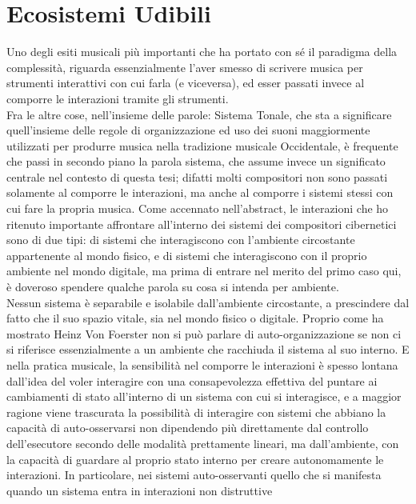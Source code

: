 \section{Ecosistemi Udibili}
\label{sec:Ecosistemi Udibili}

Uno degli esiti musicali più importanti che ha portato con sé 
il paradigma della complessità, riguarda essenzialmente l'aver smesso di 
scrivere musica per strumenti interattivi con cui farla (e viceversa), 
ed esser passati invece al  comporre le interazioni tramite gli strumenti. \\
Fra le altre cose, nell'insieme delle parole: Sistema Tonale, 
che sta a significare quell'insieme delle regole di organizzazione ed uso dei
suoni maggiormente utilizzati per produrre musica nella tradizione 
musicale Occidentale, è frequente che passi in secondo piano la parola 
sistema, che assume invece un significato centrale nel contesto di questa tesi;
difatti molti compositori non sono passati solamente al comporre le interazioni, 
ma anche al comporre i sistemi stessi con cui fare la propria musica.
Come accennato nell'abstract, le interazioni che ho ritenuto importante affrontare 
all'interno dei sistemi dei compositori cibernetici sono di due tipi:
di sistemi che interagiscono con l’ambiente circostante appartenente al mondo fisico, 
e di sistemi che interagiscono con il proprio ambiente nel mondo digitale, 
ma prima di entrare nel merito del primo caso qui,
è doveroso spendere qualche parola su cosa
si intenda per ambiente. \\
Nessun sistema è separabile e isolabile dall'ambiente circostante, 
a prescindere dal fatto che il suo spazio vitale, sia nel mondo fisico o digitale. 
Proprio come ha mostrato Heinz Von Foerster non si può parlare di auto-organizzazione
se non ci si riferisce essenzialmente a un ambiente che racchiuda il sistema al suo interno.
E nella pratica musicale, la sensibilità nel comporre le interazioni
è spesso lontana dall'idea del voler interagire con una consapevolezza effettiva del 
puntare ai cambiamenti di stato all'interno di un sistema con cui si interagisce,
e a maggior ragione viene trascurata la possibilità di interagire con sistemi che abbiano
la capacità di auto-osservarsi non dipendendo più direttamente dal controllo dell'esecutore 
secondo delle modalità prettamente lineari, 
ma dall'ambiente, 
con la capacità di guardare al proprio stato interno per creare autonomamente le interazioni.
In particolare, nei sistemi auto-osservanti quello che si manifesta quando un sistema entra in interazioni non distruttive
